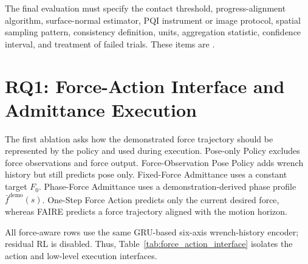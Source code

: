 The final evaluation must specify the contact threshold, progress-alignment algorithm, surface-normal estimator, PQI instrument or image protocol, spatial sampling pattern, consistency definition, units, aggregation statistic, confidence interval, and treatment of failed trials. These items are .

\section{RQ1: Force-Action Interface and Admittance Execution}
The first ablation asks how the demonstrated force trajectory should be represented by the policy and used during execution. Pose-only Policy excludes force observations and force output. Force-Observation Pose Policy adds wrench history but still predicts pose only. Fixed-Force Admittance uses a constant target \(F_0\). Phase-Force Admittance uses a demonstration-derived phase profile \(\bar f^{\mathrm{demo}}(s)\). One-Step Force Action predicts only the current desired force, whereas FAIRE predicts a force trajectory aligned with the motion horizon.

All force-aware rows use the same GRU-based six-axis wrench-history encoder; residual RL is disabled. Thus, Table~\ref{tab:force_action_interface} isolates the action and low-level execution interfaces.

\begin{table}
\centering
\caption{Planned ablation of force-action interface and admittance execution. Dashes indicate measurements not yet reported in the FAIRE source manuscript.}
\label{tab:force_action_interface}
\scriptsize
\setlength{\tabcolsep}{2.0pt}
\end{table}
\clearpage

